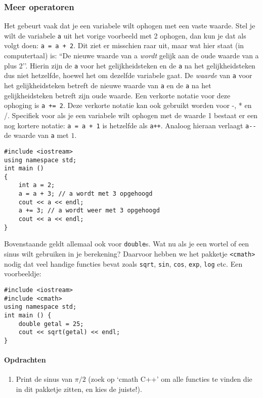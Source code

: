 \documentclass[12pt,a4paper]{article}
\newcommand{\icode}{\lstinline}
\begin{document}
\subsubsection{Meer operatoren}
Het gebeurt vaak dat je een variabele wilt ophogen met een vaste waarde. Stel je wilt de 
variabele \icode{a} uit het vorige voorbeeld met 2 ophogen, dan kun je dat als volgt doen: \icode{a = a + 2}. Dit ziet er misschien raar uit, maar wat hier staat (in computertaal) is: ``De nieuwe waarde 
van a \emph{wordt} gelijk aan de oude waarde van a plus 2’’. Hierin zijn de \icode{a} voor het 
gelijkheidsteken en de \icode{a} na het gelijkheidsteken dus niet hetzelfde, hoewel het om dezelfde 
variabele gaat. De \emph{waarde} van \icode{a} voor het gelijkheidsteken betreft de nieuwe waarde 
van \icode{a} en de \icode{a} na het gelijkheidsteken betreft zijn oude waarde. Een verkorte notatie
voor deze ophoging is \icode{a += 2}.
Deze verkorte notatie kan ook gebruikt worden voor -, * en /.
Specifiek voor als je een variabele wilt ophogen met de waarde 
1 bestaat er een nog kortere notatie: \icode{a = a + 1} is hetzelfde als \icode{a++}. 
Analoog hieraan verlaagt \icode{a--} de waarde van \icode{a} met $1$.
\begin{lstlisting}
#include <iostream> 
using namespace std; 
int main () 
{
	int a = 2; 
	a = a + 3; // a wordt met 3 opgehoogd
	cout << a << endl; 
	a += 3; // a wordt weer met 3 opgehoogd 
	cout << a << endl; 
}
\end{lstlisting}
Bovenstaande geldt allemaal ook voor \icode{double}s. Wat nu als je een wortel of een sinus wilt gebruiken 
in je berekening? Daarvoor hebben we het pakketje \icode{<cmath>} nodig dat veel handige functies 
bevat zoals \icode{sqrt}, \icode{sin}, \icode{cos}, \icode{exp}, \icode{log} etc. Een voorbeeldje: 
\begin{lstlisting}
#include <iostream> 
#include <cmath>
using namespace std; 
int main () {
	double getal = 25; 
	cout << sqrt(getal) << endl; 
}
\end{lstlisting}
\paragraph{Opdrachten}
\begin{enumerate} 
\item 
Print de sinus van $\pi/2$ (zoek op `cmath C++’ om alle functies te vinden die in dit 
pakketje zitten, en kies de juiste!). 
\end{enumerate} 
\end{document}
